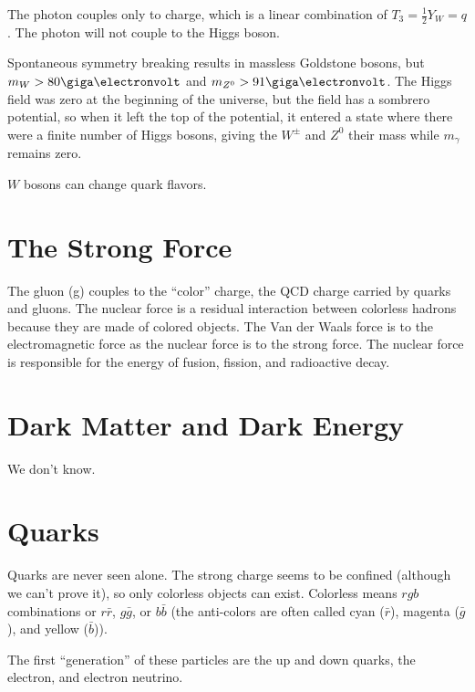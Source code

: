 \documentclass[a4paper,twoside,master.tex]{subfiles}
\begin{document}

The photon couples only to charge, which is a linear combination of $ T_3 = \frac{1}{2} Y_W = q $. The photon will not couple to the Higgs boson.

Spontaneous symmetry breaking results in massless Goldstone bosons, but $ m_W > 80\giga\electronvolt $ and $ m_{Z^0} > 91 \giga\electronvolt $. The Higgs field was zero at the beginning of the universe, but the field has a sombrero potential, so when it left the top of the potential, it entered a state where there were a finite number of Higgs bosons, giving the $ W^{\pm} $ and $ Z^0 $ their mass while $ m_{\gamma} $ remains zero.

$ W $ bosons can change quark flavors.

\section{The Strong Force}
\label{sec:the_strong_force}

The gluon (g) couples to the ``color'' charge, the QCD charge carried by quarks and gluons. The nuclear force is a residual interaction between colorless hadrons because they are made of colored objects. The Van der Waals force is to the electromagnetic force as the nuclear force is to the strong force. The nuclear force is responsible for the energy of fusion, fission, and radioactive decay.

\section{Dark Matter and Dark Energy}
\label{sec:dark_matter_and_dark_energy}

We don't know.

\section{Quarks}
\label{sec:quarks}

Quarks are never seen alone. The strong charge seems to be confined (although we can't prove it), so only colorless objects can exist. Colorless means $ rgb $ combinations or $ r \bar{r} $, $ g \bar{g} $, or $ b \bar{b} $ (the anti-colors are often called cyan ($ \bar{r} $), magenta ($ \bar{g} $), and yellow ($ \bar{b} $)).

The first ``generation'' of these particles are the up and down quarks, the electron, and electron neutrino.
\end{document}
